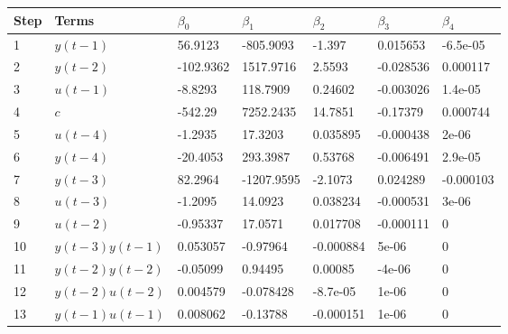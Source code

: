 \begin{tabular}{lllllll}
Step & Terms & $\beta_{0}$ & $\beta_{1}$ & $\beta_{2}$ & $\beta_{3}$ & $\beta_{4}$ \\ 
\hline 
1 & $y(t-1)$ & 56.9123 & -805.9093 & -1.397 & 0.015653 & -6.5e-05 \\ 
2 & $y(t-2)$ & -102.9362 & 1517.9716 & 2.5593 & -0.028536 & 0.000117 \\ 
3 & $u(t-1)$ & -8.8293 & 118.7909 & 0.24602 & -0.003026 & 1.4e-05 \\ 
4 & $c$ & -542.29 & 7252.2435 & 14.7851 & -0.17379 & 0.000744 \\ 
5 & $u(t-4)$ & -1.2935 & 17.3203 & 0.035895 & -0.000438 & 2e-06 \\ 
6 & $y(t-4)$ & -20.4053 & 293.3987 & 0.53768 & -0.006491 & 2.9e-05 \\ 
7 & $y(t-3)$ & 82.2964 & -1207.9595 & -2.1073 & 0.024289 & -0.000103 \\ 
8 & $u(t-3)$ & -1.2095 & 14.0923 & 0.038234 & -0.000531 & 3e-06 \\ 
9 & $u(t-2)$ & -0.95337 & 17.0571 & 0.017708 & -0.000111 & 0 \\ 
10 & $y(t-3)y(t-1)$ & 0.053057 & -0.97964 & -0.000884 & 5e-06 & 0 \\ 
11 & $y(t-2)y(t-2)$ & -0.05099 & 0.94495 & 0.00085 & -4e-06 & 0 \\ 
12 & $y(t-2)u(t-2)$ & 0.004579 & -0.078428 & -8.7e-05 & 1e-06 & 0 \\ 
13 & $y(t-1)u(t-1)$ & 0.008062 & -0.13788 & -0.000151 & 1e-06 & 0 \\ 
\hline 
\end{tabular}